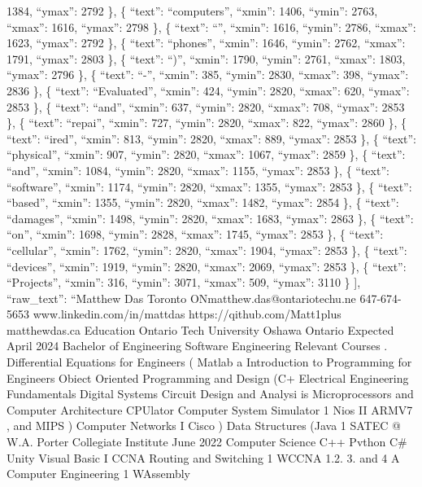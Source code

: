 \documentclass[
]{article}
\begin{document}
1384, ``ymax'': 2792 \}, \{ ``text'': ``computers'', ``xmin'': 1406,
``ymin'': 2763, ``xmax'': 1616, ``ymax'': 2798 \}, \{ ``text'':
``\textbar{}'', ``xmin'': 1616, ``ymin'': 2786, ``xmax'': 1623,
``ymax'': 2792 \}, \{ ``text'': ``phones'', ``xmin'': 1646, ``ymin'':
2762, ``xmax'': 1791, ``ymax'': 2803 \}, \{ ``text'': ``)'', ``xmin'':
1790, ``ymin'': 2761, ``xmax'': 1803, ``ymax'': 2796 \}, \{ ``text'':
``-'', ``xmin'': 385, ``ymin'': 2830, ``xmax'': 398, ``ymax'': 2836 \},
\{ ``text'': ``Evaluated'', ``xmin'': 424, ``ymin'': 2820, ``xmax'':
620, ``ymax'': 2853 \}, \{ ``text'': ``and'', ``xmin'': 637, ``ymin'':
2820, ``xmax'': 708, ``ymax'': 2853 \}, \{ ``text'': ``repai'',
``xmin'': 727, ``ymin'': 2820, ``xmax'': 822, ``ymax'': 2860 \}, \{
``text'': ``ired'', ``xmin'': 813, ``ymin'': 2820, ``xmax'': 889,
``ymax'': 2853 \}, \{ ``text'': ``physical'', ``xmin'': 907, ``ymin'':
2820, ``xmax'': 1067, ``ymax'': 2859 \}, \{ ``text'': ``and'', ``xmin'':
1084, ``ymin'': 2820, ``xmax'': 1155, ``ymax'': 2853 \}, \{ ``text'':
``software'', ``xmin'': 1174, ``ymin'': 2820, ``xmax'': 1355, ``ymax'':
2853 \}, \{ ``text'': ``based'', ``xmin'': 1355, ``ymin'': 2820,
``xmax'': 1482, ``ymax'': 2854 \}, \{ ``text'': ``damages'', ``xmin'':
1498, ``ymin'': 2820, ``xmax'': 1683, ``ymax'': 2863 \}, \{ ``text'':
``on'', ``xmin'': 1698, ``ymin'': 2828, ``xmax'': 1745, ``ymax'': 2853
\}, \{ ``text'': ``cellular'', ``xmin'': 1762, ``ymin'': 2820, ``xmax'':
1904, ``ymax'': 2853 \}, \{ ``text'': ``devices'', ``xmin'': 1919,
``ymin'': 2820, ``xmax'': 2069, ``ymax'': 2853 \}, \{ ``text'':
``Projects'', ``xmin'': 316, ``ymin'': 3071, ``xmax'': 509, ``ymax'':
3110 \} {]}, ``raw\_text'': ``Matthew Das Toronto \textbar{}
ONmatthew.das@ontariotechu.ne 647-674-5653 \textbar{}
www.linkedin.com/in/mattdas \textbar{} https://qithub.com/Matt1plus
\textbar{} matthewdas.ca Education Ontario Tech University Oshawa
Ontario Expected April 2024 Bachelor of Engineering Software Engineering
Relevant Courses . Differential Equations for Engineers ( Matlab a
Introduction to Programming for Engineers \textbar{} Obiect Oriented
Programming and Design (C+ \textbar{} Electrical Engineering
Fundamentals Digital Systems \textbar{} Circuit Design and Analysi is
\textbar{} Microprocessors and Computer Architecture CPUlator Computer
System Simulator 1 Nios II ARMV7 , and MIPS ) Computer Networks I Cisco
) Data Structures (Java 1 SATEC @ W.A. Porter Collegiate Institute June
2022 Computer Science C++ Pvthon C\# Unity Visual Basic I CCNA Routing
and Switching 1 WCCNA 1.2. 3. and 4 A Computer Engineering 1 WAssembly
\end{document}
